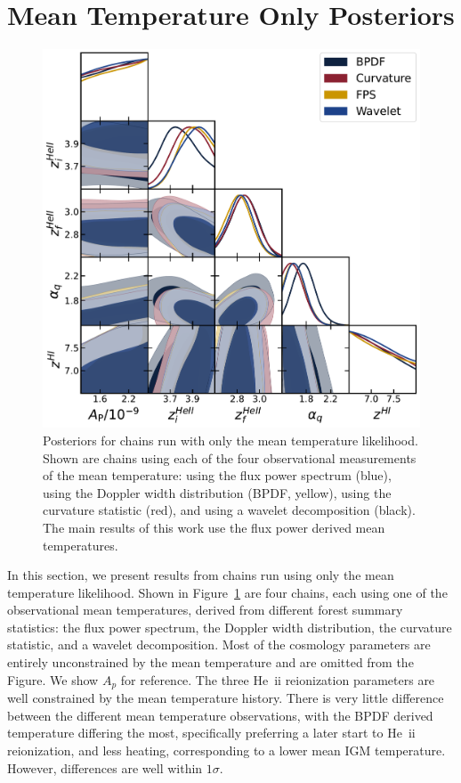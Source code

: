 \section{Mean Temperature Only Posteriors}\label{sec:t0-only}

\begin{figure}
    \centering
    \includegraphics[width=\textwidth]{figures/datasets_t0_corner.pdf}
    \caption{\label{fig:t0_datasets}
    Posteriors for chains run with only the mean temperature likelihood.
    Shown are chains using each of the four observational measurements of the mean temperature: using the flux power spectrum (blue), using the Doppler width distribution (BPDF, yellow), using the curvature statistic (red), and using a wavelet decomposition (black).
    The main results of this work use the flux power derived mean temperatures.
    }
\end{figure}

In this section, we present results from chains run using only the mean temperature likelihood.
Shown in Figure~\ref{fig:t0_datasets} are four chains, each using one of the observational mean temperatures, derived from different \lya forest summary statistics: the flux power spectrum, the Doppler width distribution, the curvature statistic, and a wavelet decomposition.
Most of the cosmology parameters are entirely unconstrained by the mean temperature and are omitted from the Figure.
We show $A_p$ for reference.
The three He~{\sc ii} reionization parameters are well constrained by the mean temperature history.
There is very little difference between the different mean temperature observations, with the BPDF derived temperature differing the most, specifically preferring a later start to He~{\sc ii} reionization, and less heating, corresponding to a lower mean IGM temperature.
However, differences are well within $1\sigma$.

